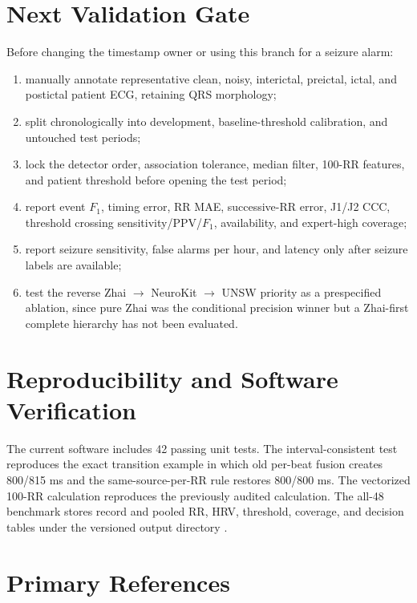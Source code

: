 \documentclass[10pt]{article}
\begin{document}
\section{Next Validation Gate}

Before changing the timestamp owner or using this branch for a seizure alarm:
\begin{enumerate}
\item manually annotate representative clean, noisy, interictal, preictal,
      ictal, and postictal patient ECG, retaining QRS morphology;
\item split chronologically into development, baseline-threshold calibration,
      and untouched test periods;
\item lock the detector order, association tolerance, median filter, 100-RR
      features, and patient threshold before opening the test period;
\item report event $F_1$, timing error, RR MAE, successive-RR error, J1/J2 CCC,
      threshold crossing sensitivity/PPV/$F_1$, availability, and expert-high
      coverage;
\item report seizure sensitivity, false alarms per hour, and latency only after
      seizure labels are available;
\item test the reverse Zhai $\rightarrow$ NeuroKit $\rightarrow$ UNSW priority
      as a prespecified ablation, since pure Zhai was the conditional precision
      winner but a Zhai-first complete hierarchy has not been evaluated.
\end{enumerate}

\section{Reproducibility and Software Verification}

The current software includes 42 passing unit tests. The interval-consistent
test reproduces the exact transition example in which old per-beat fusion
creates 800/815 ms and the same-source-per-RR rule restores 800/800 ms. The
vectorized 100-RR calculation reproduces the previously audited calculation.
The all-48 benchmark stores record and pooled RR, HRV, threshold, coverage, and
decision tables under the versioned output directory
.

\section*{Primary References}
\end{document}
